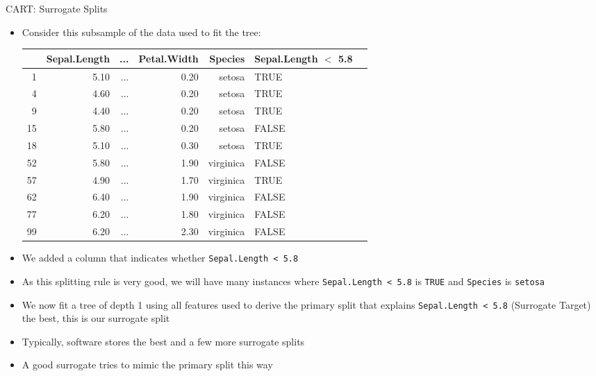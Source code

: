 \documentclass[11pt,compress,t,notes=noshow, xcolor=table]{beamer}
\begin{document}
\begin{vbframe}{CART: Surrogate Splits}
\begin{itemize}
\item Consider this subsample of the data used to fit the tree:
\begin{table}[ht]
\tiny
\centering
\begin{tabular}{rrrrrll}
  \hline
 & Sepal.Length & ... & Petal.Width & Species & Sepal.Length $<$ 5.8 \\ 
  \hline
1 & 5.10 & ... & 0.20 & setosa & TRUE \\ 
  4 & 4.60 & ... & 0.20 & setosa & TRUE \\ 
  9 & 4.40 & ... & 0.20 & setosa & TRUE \\ 
  15 & 5.80 & ... & 0.20 & setosa & FALSE \\ 
  18 & 5.10 & ... & 0.30 & setosa & TRUE \\ 
  52 & 5.80 & ... & 1.90 & virginica & FALSE \\ 
  57 & 4.90 & ... & 1.70 & virginica & TRUE \\ 
  62 & 6.40 & ... & 1.90 & virginica & FALSE \\ 
  77 & 6.20 & ... & 1.80 & virginica & FALSE \\ 
  99 & 6.20 & ... & 2.30 & virginica & FALSE \\ 
   \hline
\end{tabular}
\end{table}
\item We added a column that indicates whether \texttt{Sepal.Length < 5.8}
\item As this splitting rule is very good, we will have many instances where \texttt{Sepal.Length < 5.8} is \texttt{TRUE} and \texttt{Species} is \texttt{setosa}
\item We now fit a tree of depth 1 using all features used to derive the primary split that explains \texttt{Sepal.Length < 5.8} (Surrogate Target) the best, this is our surrogate split
\item Typically, software stores the best and a few more surrogate splits
\item A good surrogate tries to mimic the primary split this way

\end{itemize}


\end{vbframe}


\endlecture
\end{document}
